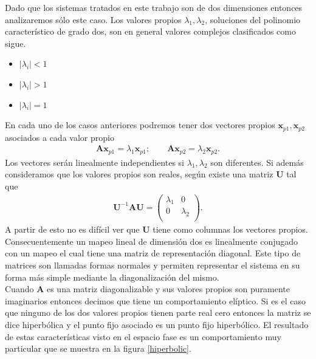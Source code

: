 Dado que los sistemas tratados en este trabajo son de dos dimensiones entonces analizaremos sólo este caso. Los valores propios $\lambda_{1}, \lambda_{2}$, soluciones del polinomio característico de grado dos, son en general valores complejos clasificados como sigue.
\begin{itemize}
\item $\vert \lambda_{i}\vert<1$
\item $\vert \lambda_{i}\vert>1$
\item $\vert \lambda_{i}\vert=1$
\end{itemize}
En cada uno de los casos anteriores podremos tener dos vectores propios $\mathbf{x}_{p1}, \mathbf{x}_{p2}$ asociados a cada valor propio
\begin{eqnarray}
\mathbf{A}\mathbf{x}_{p1}=\lambda_{1}\mathbf{x}_{p1} ;\qquad \mathbf{A}\mathbf{x}_{p2}=\lambda_{2}\mathbf{x}_{p2}.
\end{eqnarray}
Los vectores serán linealmente independientes si $\lambda_{1},\lambda_{2}$ son diferentes. Si además consideramos que los valores propios son reales, según \cite{Friedberg} existe una matriz $\mathbf{U}$ tal que 
\begin{eqnarray}
\mathbf{U}^{-1}\mathbf{A}\mathbf{U} = \begin{pmatrix}
\lambda_{1} & 0\\
0 & \lambda_{2}\\
\end{pmatrix}.
\end{eqnarray}
A partir de esto no es difícil ver que $\mathbf{U}$ tiene como columnas los vectores propios. Consecuentemente un mapeo lineal de dimensión dos es linealmente conjugado con un mapeo el cual tiene una matriz de representación diagonal. Este tipo de matrices son llamadas formas normales y
permiten representar el sistema en su forma más simple mediante la diagonalización del mismo.\\

Cuando $\mathbf{A}$ es una matriz diagonalizable y sus valores propios son puramente imaginarios entonces decimos que tiene un comportamiento elíptico. Si es el caso que ninguno de los dos valores propios tienen parte real cero entonces la matriz se dice hiperbólica y el punto fijo asociado es un punto fijo hiperbólico. El resultado de estas características visto en el espacio fase es un comportamiento muy particular que se muestra en la figura \ref{hiperbolic}. \\

